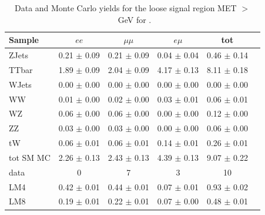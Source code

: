 \begin{table}[htb]
\begin{center}
\caption{\label{sigyieldtableloose} Data and Monte Carlo yields for the loose signal region MET $>$ \signalmetl~GeV  for \lumi.}
\begin{tabular}{lccccc}
\hline
              Sample   &                $ee$   &            $\mu\mu$   &              $e\mu$   &                 tot  \\
\hline
               ZJets   &     0.21 $\pm$ 0.09   &     0.21 $\pm$ 0.09   &     0.04 $\pm$ 0.04   &     0.46 $\pm$ 0.14  \\
               TTbar   &     1.89 $\pm$ 0.09   &     2.04 $\pm$ 0.09   &     4.17 $\pm$ 0.13   &     8.11 $\pm$ 0.18  \\
               WJets   &     0.00 $\pm$ 0.00   &     0.00 $\pm$ 0.00   &     0.00 $\pm$ 0.00   &     0.00 $\pm$ 0.00  \\
                  WW   &     0.01 $\pm$ 0.00   &     0.02 $\pm$ 0.00   &     0.03 $\pm$ 0.01   &     0.06 $\pm$ 0.01  \\
                  WZ   &     0.06 $\pm$ 0.00   &     0.06 $\pm$ 0.00   &     0.00 $\pm$ 0.00   &     0.12 $\pm$ 0.00  \\
                  ZZ   &     0.03 $\pm$ 0.00   &     0.03 $\pm$ 0.00   &     0.00 $\pm$ 0.00   &     0.06 $\pm$ 0.00  \\
                  tW   &     0.06 $\pm$ 0.01   &     0.06 $\pm$ 0.01   &     0.14 $\pm$ 0.01   &     0.26 $\pm$ 0.01  \\
\hline
           tot SM MC   &     2.26 $\pm$ 0.13   &     2.43 $\pm$ 0.13   &     4.39 $\pm$ 0.13   &     9.07 $\pm$ 0.22  \\
\hline
                data   &                   0   &                   7   &                   3   &                  10  \\
\hline
                 LM4   &     0.42 $\pm$ 0.01   &     0.44 $\pm$ 0.01   &     0.07 $\pm$ 0.01   &     0.93 $\pm$ 0.02  \\
                 LM8   &     0.19 $\pm$ 0.01   &     0.22 $\pm$ 0.01   &     0.07 $\pm$ 0.00   &     0.48 $\pm$ 0.01  \\
\hline
\end{tabular}
\end{center}
\end{table}



